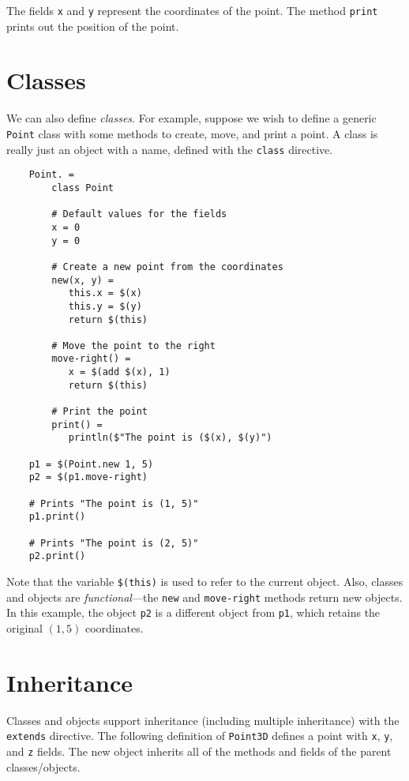 The fields \verb+x+ and \verb+y+ represent the coordinates of the point.  The method \verb+print+
prints out the position of the point.

\section{Classes}

We can also define \emph{classes}.  For example, suppose we wish to define a generic \verb+Point+
class with some methods to create, move, and print a point.  A class is really just an object with
a name, defined with the \verb+class+ directive.

\begin{verbatim}
    Point. =
        class Point

        # Default values for the fields
        x = 0
        y = 0

        # Create a new point from the coordinates
        new(x, y) =
           this.x = $(x)
           this.y = $(y)
           return $(this)

        # Move the point to the right
        move-right() =
           x = $(add $(x), 1)
           return $(this)

        # Print the point
        print() =
           println($"The point is ($(x), $(y)")

    p1 = $(Point.new 1, 5)
    p2 = $(p1.move-right)

    # Prints "The point is (1, 5)"
    p1.print()

    # Prints "The point is (2, 5)"
    p2.print()
\end{verbatim}

Note that the variable \verb+$(this)+ is used to refer to the current object.  Also, classes and
objects are \emph{functional}---the \verb+new+ and \verb+move-right+ methods return new objects.  In
this example, the object \verb+p2+ is a different object from \verb+p1+, which retains the original
$(1, 5)$ coordinates.

\section{Inheritance}

Classes and objects support inheritance (including multiple inheritance) with the \verb+extends+
directive.  The following definition of \verb+Point3D+ defines a point with \verb+x+, \verb+y+, and
\verb+z+ fields.  The new object inherits all of the methods and fields of the parent classes/objects.

